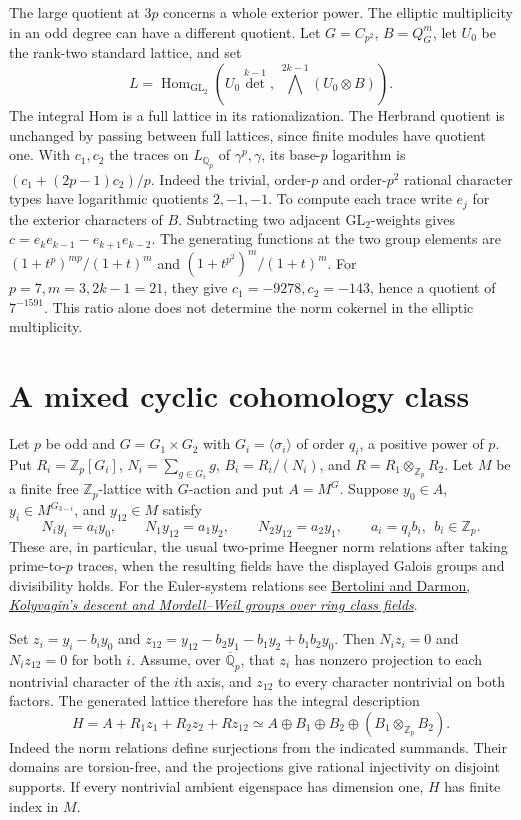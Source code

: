 \documentclass[11pt]{article}
\newcommand{\Q}{\mathbb Q}
\begin{document}
The large quotient at $3p$ concerns a whole exterior power. The
elliptic multiplicity in an odd degree can have a different quotient.
Let $G=C_{p^2}$, $B=Q_G^m$, let $U_0$ be the rank-two standard lattice,
and set
\[
 L=\operatorname{Hom}_{\mathrm{GL}_2}
 (U_0\det^{k-1},\ \bigwedge^{2k-1}(U_0\otimes B)).
\]
The integral Hom is a full lattice in its rationalization. The
Herbrand quotient is unchanged by passing between full lattices,
since finite modules have quotient one. With $c_1,c_2$ the traces on
$L_{\Q_p}$ of $\gamma^p,\gamma$, its base-$p$ logarithm is
$(c_1+(2p-1)c_2)/p$. Indeed the trivial, order-$p$ and order-$p^2$
rational character types have logarithmic quotients $2,-1,-1$.
To compute each trace write $e_j$ for the exterior characters of $B$.
Subtracting two adjacent $\mathrm{GL}_2$-weights gives
$c=e_ke_{k-1}-e_{k+1}e_{k-2}$. The generating functions at the two
group elements are $(1+t^p)^{mp}/(1+t)^m$ and
$(1+t^{p^2})^m/(1+t)^m$. For $p=7,m=3,2k-1=21$, they give
$c_1=-9278,c_2=-143$, hence a quotient of $7^{-1591}$.
This ratio alone does not determine the norm cokernel in the elliptic
multiplicity.

\section{A mixed cyclic cohomology class}
\label{sec:mixed-heegner-lattice}
Let $p$ be odd and $G=G_1\times G_2$ with
$G_i=\langle\sigma_i\rangle$ of order $q_i$, a positive power
of $p$. Put $R_i=\mathbb Z_p[G_i]$, $N_i=\sum_{g\in G_i} g$,
$B_i=R_i/(N_i)$, and $R=R_1\otimes_{\mathbb Z_p}R_2$.
Let $M$ be a finite free $\mathbb Z_p$-lattice with $G$-action
and put $A=M^G$. Suppose $y_0\in A$, $y_i\in M^{G_{3-i}}$,
and $y_{12}\in M$ satisfy
\[
 N_i y_i=a_i y_0,\qquad N_1 y_{12}=a_1y_2,\qquad
 N_2 y_{12}=a_2y_1,\qquad a_i=q_i b_i,\ \ b_i\in\mathbb Z_p .
\]
These are, in particular, the usual two-prime Heegner norm relations
after taking prime-to-$p$ traces, when the resulting fields have the
displayed Galois groups and divisibility holds. For the Euler-system
relations see \href{https://www.math.mcgill.ca/darmon/pub/Articles/Research/04.Kolyvagin-descent/paper.pdf}{Bertolini and Darmon, \emph{Kolyvagin's descent and Mordell--Weil groups over ring class fields}}.

Set $z_i=y_i-b_i y_0$ and
$z_{12}=y_{12}-b_2y_1-b_1y_2+b_1b_2y_0$.
Then $N_i z_i=0$ and $N_i z_{12}=0$ for both $i$.
Assume, over $\overline{\mathbb Q}_p$, that $z_i$ has nonzero
projection to each nontrivial character of the $i$th axis, and
$z_{12}$ to every character nontrivial on both factors. The generated
lattice therefore has the integral description
\[
 H=A+R_1z_1+R_2z_2+Rz_{12}
 \simeq A\oplus B_1\oplus B_2
 \oplus (B_1\otimes_{\mathbb Z_p} B_2).
\]
Indeed the norm relations define surjections from the indicated
summands. Their domains are torsion-free, and the projections give
rational injectivity on disjoint supports. If every nontrivial
ambient eigenspace has dimension one, $H$ has finite index in $M$.
\end{document}
